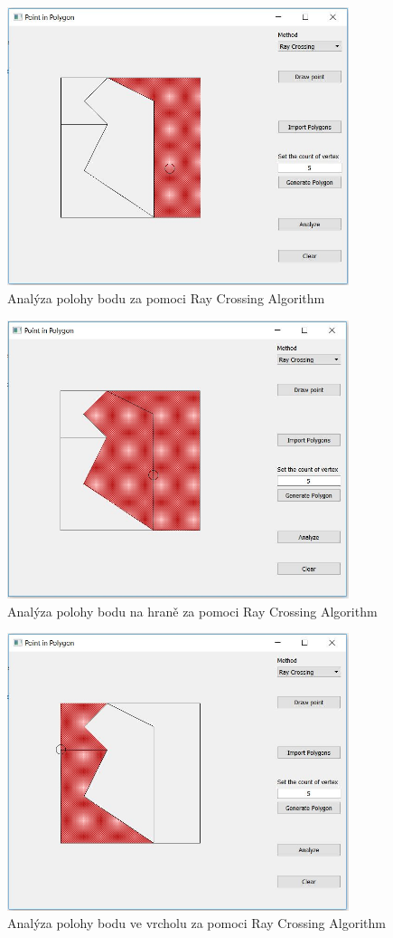 \documentclass[a4paper, 12pt]{article}
\begin{document}
\begin{figure}[h!]
	\centering
	\includegraphics[width=10cm]{ray_inside.jpg}
	\caption{Analýza polohy bodu za pomoci Ray Crossing Algorithm}
\end{figure}

\begin{figure}[h!]
	\centering
	\includegraphics[width=10cm]{ray_boundary.jpg}
	\caption{Analýza polohy bodu na hraně za pomoci Ray Crossing Algorithm}
\end{figure}

\begin{figure}[h!]
	\centering
	\includegraphics[width=10cm]{ray_vertex.jpg}
	\caption{Analýza polohy bodu ve vrcholu za pomoci Ray Crossing Algorithm}
\end{figure}
\end{document}
